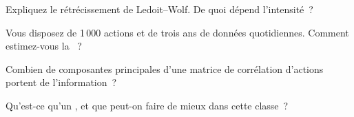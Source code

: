 \begin{interviewq}\label{iq:qm:covariance-estimation-and-random-matrices:3}
Expliquez le rétrécissement de Ledoit--Wolf. De quoi dépend l'intensité~?
\end{interviewq}

\begin{interviewq}\label{iq:qm:covariance-estimation-and-random-matrices:4}
Vous disposez de 1\,000 actions et de trois ans de données quotidiennes. Comment estimez-vous la ~?
\end{interviewq}

\begin{interviewq}\label{iq:qm:covariance-estimation-and-random-matrices:5}
Combien de composantes principales d'une matrice de corrélation d'actions portent de l'information~?
\end{interviewq}

\begin{interviewq}\label{iq:qm:covariance-estimation-and-random-matrices:6}
Qu'est-ce qu'un , et que peut-on faire de mieux dans cette classe~?
\end{interviewq}
